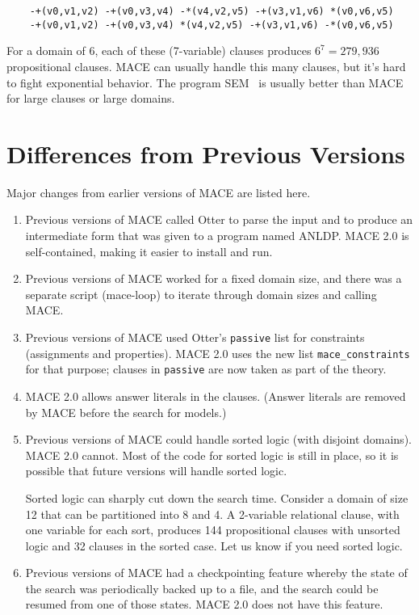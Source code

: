 \documentclass[11pt]{article}
\begin{document}
\begin{small}
\begin{verbatim}
    -+(v0,v1,v2) -+(v0,v3,v4) -*(v4,v2,v5) -+(v3,v1,v6) *(v0,v6,v5)
    -+(v0,v1,v2) -+(v0,v3,v4) *(v4,v2,v5) -+(v3,v1,v6) -*(v0,v6,v5)
\end{verbatim}
\end{small}
\noindent
For a domain of 6, each of these (7-variable) clauses produces $6^7=279,936$
propositional clauses.  MACE can usually handle this many clauses,
but it's hard to fight exponential behavior.  The program SEM~\cite{sem}
is usually better than MACE for large clauses or large domains.

\section{Differences from Previous Versions} \label{history}

Major changes from earlier versions of MACE are listed here.

\begin{enumerate}
\item
Previous versions of MACE called Otter to parse the input
and to produce an intermediate form that was given to a program
named ANLDP.  MACE 2.0 is self-contained, making it easier to install and run.
\item
Previous versions of MACE worked for a fixed domain size, and
there was a separate script (mace-loop) to iterate through
domain sizes and calling MACE.
\item
Previous versions of MACE used Otter's \texttt{passive} list
for constraints (assignments and properties).  MACE 2.0 uses the new
list \texttt{mace\_constraints} for that purpose; clauses in \texttt{passive}
are now taken as part of the theory.
\item
MACE 2.0 allows answer literals in the clauses.  (Answer literals
are removed by MACE before the search for models.)
\item
Previous versions of MACE could handle sorted logic (with
disjoint domains).  MACE 2.0 cannot.  Most of the code for
sorted logic is still in place, so it is possible that
future versions will handle sorted logic.  

Sorted logic can sharply cut down the search time.  Consider
a domain of size 12 that can be partitioned into 8 and 4.
A 2-variable relational clause, with one variable for each sort,
produces 144 propositional clauses with unsorted logic
and 32 clauses in the sorted case.
Let us know if you need sorted logic.
\item
Previous versions of MACE had a checkpointing feature whereby
the state of the search was periodically backed up to a file,
and the search could be resumed from one of those states.
MACE 2.0 does not have this feature.
\end{enumerate}
\end{document}
